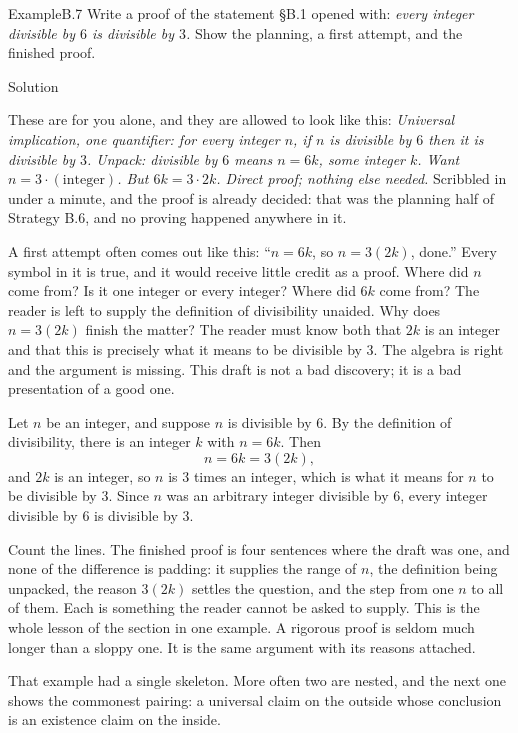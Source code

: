 \documentclass[a4paper,12pt,oneside]{memoir}
\begin{document}
\begin{workedexample}
\begin{envexample}{Example}{B.7}{}
Write a proof of the statement §B.1 opened with: \emph{every integer divisible by \(6\) is divisible by \(3\).} Show the planning, a first attempt, and the finished proof.
\end{envexample}
\begin{envsolution}{Solution}{}{}
\begin{sollist}
  \item {} These are for you alone, and they are allowed to look like this: \emph{Universal implication, one quantifier: for every integer \(n\), if \(n\) is divisible by \(6\) then it is divisible by \(3\). Unpack: divisible by \(6\) means \(n = 6k\), some integer \(k\). Want \(n = 3 \cdot (\text{integer})\). But \(6k = 3 \cdot 2k\). Direct proof; nothing else needed.} Scribbled in under a minute, and the proof is already decided: that was the planning half of Strategy B.6, and no proving happened anywhere in it.
  \item {} A first attempt often comes out like this: “\(n = 6k\), so \(n = 3(2k)\), done.” Every symbol in it is true, and it would receive little credit as a proof. Where did \(n\) come from? Is it one integer or every integer? Where did \(6k\) come from? The reader is left to supply the definition of divisibility unaided. Why does \(n = 3(2k)\) finish the matter? The reader must know both that \(2k\) is an integer and that this is precisely what it means to be divisible by \(3\). The algebra is right and the argument is missing. This draft is not a bad discovery; it is a bad presentation of a good one.
  \item {} Let \(n\) be an integer, and suppose \(n\) is divisible by \(6\). By the definition of divisibility, there is an integer \(k\) with \(n = 6k\). Then \[ n = 6k = 3(2k), \] and \(2k\) is an integer, so \(n\) is \(3\) times an integer, which is what it means for \(n\) to be divisible by \(3\). Since \(n\) was an arbitrary integer divisible by \(6\), every integer divisible by \(6\) is divisible by \(3\).
\end{sollist}
Count the lines. The finished proof is four sentences where the draft was one, and none of the difference is padding: it supplies the range of \(n\), the definition being unpacked, the reason \(3(2k)\) settles the question, and the step from one \(n\) to all of them. Each is something the reader cannot be asked to supply. This is the whole lesson of the section in one example. A rigorous proof is seldom much longer than a sloppy one. It is the same argument with its reasons attached.
\end{envsolution}
\end{workedexample}
That example had a single skeleton. More often two are nested, and the next one shows the commonest pairing: a universal claim on the outside whose conclusion is an existence claim on the inside.
\end{document}
